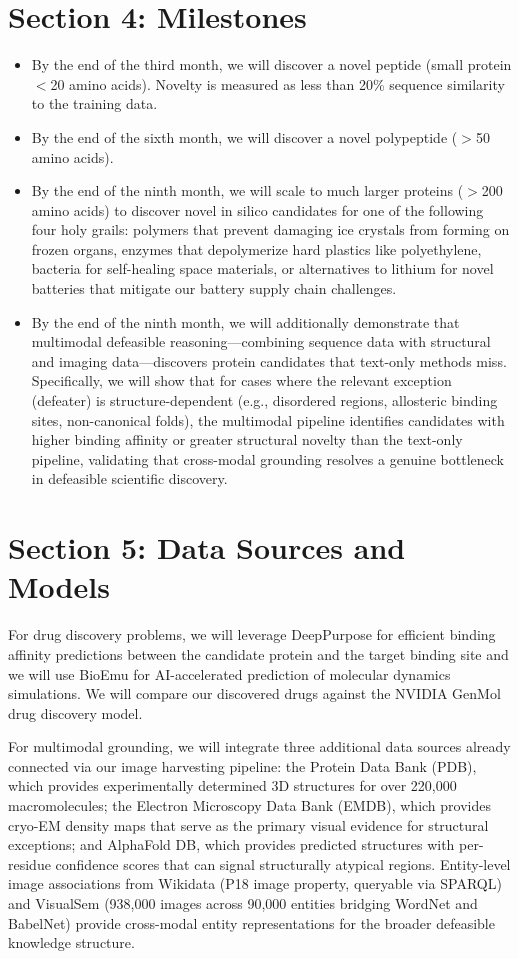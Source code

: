 \documentclass[11pt]{article}
\begin{document}
\section*{Section 4: Milestones}

\begin{itemize}[leftmargin=1.5em, nosep]
\item By the end of the third month, we will discover a novel peptide (small protein $<$20 amino acids). Novelty is measured as less than 20\% sequence similarity to the training data.
\item By the end of the sixth month, we will discover a novel polypeptide ($>$50 amino acids).
\item By the end of the ninth month, we will scale to much larger proteins ($>$200 amino acids) to discover novel in silico candidates for one of the following four holy grails: polymers that prevent damaging ice crystals from forming on frozen organs, enzymes that depolymerize hard plastics like polyethylene, bacteria for self-healing space materials, or alternatives to lithium for novel batteries that mitigate our battery supply chain challenges.
\item By the end of the ninth month, we will additionally demonstrate that multimodal defeasible reasoning---combining sequence data with structural and imaging data---discovers protein candidates that text-only methods miss. Specifically, we will show that for cases where the relevant exception (defeater) is structure-dependent (e.g., disordered regions, allosteric binding sites, non-canonical folds), the multimodal pipeline identifies candidates with higher binding affinity or greater structural novelty than the text-only pipeline, validating that cross-modal grounding resolves a genuine bottleneck in defeasible scientific discovery.
\end{itemize}

\section*{Section 5: Data Sources and Models}

For drug discovery problems, we will leverage DeepPurpose for efficient binding affinity predictions between the candidate protein and the target binding site and we will use BioEmu for AI-accelerated prediction of molecular dynamics simulations. We will compare our discovered drugs against the NVIDIA GenMol drug discovery model.

For multimodal grounding, we will integrate three additional data sources already connected via our image harvesting pipeline: the Protein Data Bank (PDB), which provides experimentally determined 3D structures for over 220,000 macromolecules; the Electron Microscopy Data Bank (EMDB), which provides cryo-EM density maps that serve as the primary visual evidence for structural exceptions; and AlphaFold DB, which provides predicted structures with per-residue confidence scores that can signal structurally atypical regions. Entity-level image associations from Wikidata (P18 image property, queryable via SPARQL) and VisualSem (938,000 images across 90,000 entities bridging WordNet and BabelNet) provide cross-modal entity representations for the broader defeasible knowledge structure.
\end{document}
